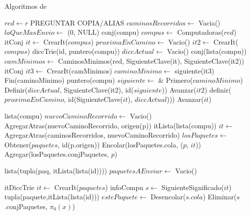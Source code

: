 \begin{Algoritmos}


\begin{algorithm}
  \caption{Algoritmos de }


\begin{algorithmic}[1]
  \State $red \gets r$  PREGUNTAR COPIA/ALIAS
  \State $caminosRecorridos \gets$ Vacia()
  \State $laQueMasEnvio \gets$ (0, NULL)
  \State conj(compu) $compus \gets$ Computadoras($red$)
  \State itConj $it \gets$ CrearIt($compus$)
  \State $proximaEnCamino \gets$ Vacio()
    \State {} $it2 \gets$ CrearIt($compus$)
    \State diccTrie(id, puntero(compu)) $diccActual \gets$ Vacio()
      \State conj(lista(compu)) $camMinimos \gets$ CaminosMinimos(red, SiguienteClave(it), SiguienteClave(it2))
      \State itConj $it3 \gets$ CrearIt(camMinimos)
      \State $caminoMinimo \gets$ siguiente(it3)
      \State Fin(caminoMinimo)
      \State puntero(compu) $siguiente \gets$ \& Primero($caminoMinimo$)
      \State Definir($diccActual$, SiguienteClave(it2), id($siguiente$))
      \State Avanzar($it2$)            
    \EndWhile
    \State definir($proximaEnCamino$, id(SiguienteClave($it$), $diccActual$)))
    \State Avanzar($it$)
  \EndWhile
   
  \EndProcedure
\end{algorithmic}


\begin{algorithmic}[1]
   \State lista(compu) $nuevoCaminoRecorrido \gets$ Vacio()
   \State AgregarAtras(nuevoCaminoRecorrido, origen(p))
   \State itLista(lista(compu)) $it \gets$ AgregarAtras(caminosRecorridos, nuevoCaminoRecorrido)
   \State $losPaquetes \gets $ Obtener($paquetes$, id(p.origen))
   \State Encolar(losPaquetes.cola, ($p$, $it$))
   \State Agregar(losPaquetes.conjPaquetes, $p$)
  \EndProcedure
\end{algorithmic}


\begin{algorithmic}[1]
  
  \State lista(tupla(paq, itLista(lista(id)))) $paquetesAEnviar \gets$ Vacio()
  
  \State itDiccTrie $it \gets$ CrearIt($paquetes$)
  	\State infoCompu $s \gets$ SiguienteSignificado($it$) 
  		\State tupla(paquete,itLista(lista(id))) $estePaquete \gets$ Desencolar($s$.$cola$)
  		\State Eliminar($s$.conjPaquetes, $\pi_0(x)$)
      		

\end{algorithmic}
\end{algorithm}
\end{Algoritmos}
